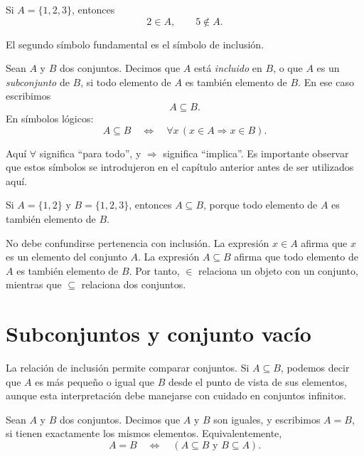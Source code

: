\begin{ejemplo}
Si \(A=\{1,2,3\}\), entonces
\[
  2\in A,
  \qquad
  5\notin A.
\]
\end{ejemplo}

El segundo símbolo fundamental es el símbolo de inclusión.

\begin{definicion}[Inclusión]
Sean \(A\) y \(B\) dos conjuntos. Decimos que \(A\) está \emph{incluido} en \(B\), o que \(A\) es un \emph{subconjunto} de \(B\), si todo elemento de \(A\) es también elemento de \(B\). En ese caso escribimos
\[
  A\subseteq B.
\]
En símbolos lógicos:
\[
  A\subseteq B
  \quad\Longleftrightarrow\quad
  \forall x\,(x\in A \Rightarrow x\in B).
\]
\end{definicion}

Aquí \(\forall\) significa ``para todo'', y \(\Rightarrow\) significa ``implica''. Es importante observar que estos símbolos se introdujeron en el capítulo anterior antes de ser utilizados aquí.

\begin{ejemplo}
Si \(A=\{1,2\}\) y \(B=\{1,2,3\}\), entonces \(A\subseteq B\), porque todo elemento de \(A\) es también elemento de \(B\).
\end{ejemplo}

\begin{advertencia}
No debe confundirse pertenencia con inclusión. La expresión \(x\in A\) afirma que \(x\) es un elemento del conjunto \(A\). La expresión \(A\subseteq B\) afirma que todo elemento de \(A\) es también elemento de \(B\). Por tanto, \(\in\) relaciona un objeto con un conjunto, mientras que \(\subseteq\) relaciona dos conjuntos.
\end{advertencia}

\section{Subconjuntos y conjunto vacío}

La relación de inclusión permite comparar conjuntos. Si \(A\subseteq B\), podemos decir que \(A\) es más pequeño o igual que \(B\) desde el punto de vista de sus elementos, aunque esta interpretación debe manejarse con cuidado en conjuntos infinitos.

\begin{definicion}
Sean \(A\) y \(B\) dos conjuntos. Decimos que \(A\) y \(B\) son iguales, y escribimos \(A=B\), si tienen exactamente los mismos elementos. Equivalentemente,
\[
  A=B
  \quad\Longleftrightarrow\quad
  (A\subseteq B \text{ y } B\subseteq A).
\]
\end{definicion}

